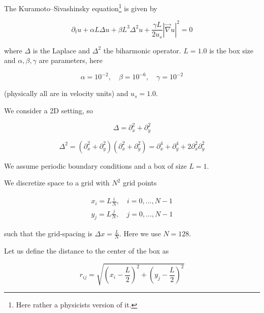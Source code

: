     The Kuramoto–Sivashinsky equation\footnote{Here rather a physicists version of it.} is given by

    \begin{equation}
        \partial_t u + \alpha L \Delta u + \beta L^3 \Delta^2 u + \frac{\gamma L}{2u_s} |\vec{\nabla}u|^2 = 0
    \end{equation}

    where $\Delta$ is the Laplace and $\Delta^2$ the biharmonic operator. $L = 1.0$ is the box size and $\alpha, \beta, \gamma$ are parameters, here

    \begin{equation}
        \alpha = 10^{-2}, \quad \beta = 10^{-6}, \quad \gamma = 10^{-2}
    \end{equation}

    (physically all are in velocity units) and $u_s = 1.0$.

    We consider a 2D setting, so

    \begin{equation}
        \Delta = \partial_x^2 + \partial_y^2 
    \end{equation}

    \begin{equation}
        \Delta^2 = (\partial_x^2 + \partial_y^2)(\partial_x^2 + \partial_y^2) = \partial_x^4 + \partial_y^4 + 2 \partial_x^2 \partial_y^2
    \end{equation}

    We assume periodic boundary conditions and a box of size $L = 1$.

    We discretize space to a grid with $N^2$ grid points

    \begin{equation}
        \begin{aligned}
            x_i = L \frac{i}{N}, \quad i = 0,...,N-1 \\
            y_j = L \frac{j}{N}, \quad j = 0,...,N-1
        \end{aligned}
    \end{equation}

    such that the grid-spacing is $\Delta x = \frac{L}{N}$. Here we use $N = 128$.

    Let us define the distance to the center of the box as

    \begin{equation}
        r_{ij} = \sqrt{\left(x_i - \frac{L}{2}\right)^2 + \left(y_j - \frac{L}{2}\right)^2}
    \end{equation}

